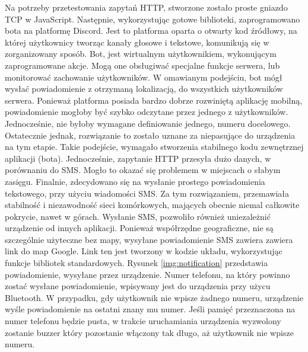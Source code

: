 Na potrzeby przetestowania zapytań HTTP, stworzone zostało proste gniazdo TCP w JavaScript. Następnie, wykorzystując gotowe biblioteki, zaprogramowano bota na platformę Discord. Jest to platforma oparta o otwarty kod źródłowy, na której użytkownicy tworząc kanały głosowe i tekstowe, komunikują się w zorganizowany sposób. Bot, jest wirtualnym użytkownikiem, wykonującym zaprogramowane akcje. Mogą one obsługiwać specjalne funkcje serwera, lub monitorować zachowanie użytkowników. W omawianym podejściu, bot mógł wysłać powiadomienie z otrzymaną lokalizacją, do wszystkich użytkowników serwera. Ponieważ platforma posiada bardzo dobrze rozwiniętą aplikację mobilną, powiadomienie mogłoby być szybko odczytane przez jednego z użytkowników. Jednocześnie, nie byłoby wymagane definiowanie jednego, numeru docelowego. Ostatecznie jednak, rozwiązanie to zostało uznane za niepasujące do urządzenia na tym etapie. Takie podejście, wymagało stworzenia stabilnego kodu zewnętrznej aplikacji (bota). Jednocześnie, zapytanie HTTP przesyła dużo danych, w porównaniu do SMS. Mogło to okazać się problemem w miejscach o słabym zasięgu.
\newline
Finalnie, zdecydowano się na wysłanie prostego powiadomienia tekstowego, przy użyciu wiadomości SMS. Za tym rozwiązaniem, przemawiała stabilność i niezawodność sieci komórkowych, mających obecnie niemal całkowite pokrycie, nawet w górach. Wysłanie SMS, pozwoliło również uniezależnić urządzenie od innych aplikacji.
Ponieważ współrzędne geograficzne, nie są szczególnie użyteczne bez mapy, wysyłane powiadomienie SMS zawiera zawiera link do map Google. Link ten jest tworzony w kodzie układu, wykorzystując funkcje bibliotek standardowych. Rysunek \ref{img:notification} przedstawia powiadomienie, wysyłane przez urządzenie. Numer telefonu, na który powinno zostać wysłane powiadomienie, wpisywany jest do urządzenia przy użycu Bluetooth. W przypadku, gdy użytkownik nie wpisze żadnego numeru, urządzenie wyśle powiadomienie na ostatni znany mu numer. Jeśli pamięć przeznaczona na numer telefonu będzie pusta, w trakcie uruchamiania urządzenia wyzwolony zostanie buzzer który pozostanie włączony tak długo, aż użytkownik nie wpisze numeru. 

